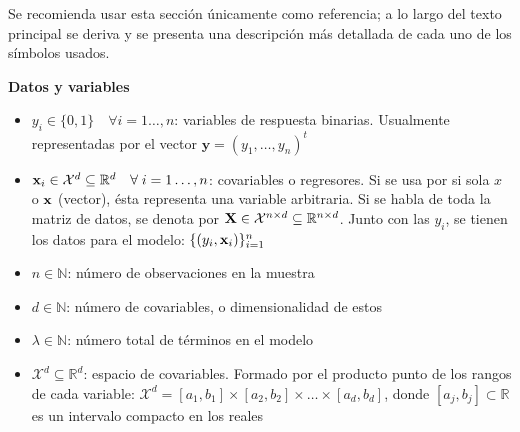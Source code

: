 \documentclass[../../Main/Main.tex]{subfiles}
\begin{document}
Se recomienda usar esta sección únicamente como referencia; a lo largo del texto principal se deriva y se presenta una descripción más detallada de cada uno de los símbolos usados. 

\textbf{Datos y variables}
\begin{itemize}[label={}]
	\item $y_i \in \{0,1\}\quad \forall i = 1\ldots,n$: variables de respuesta binarias. Usualmente representadas por el vector $\mathbf{y} = (y_1,\ldots,y_n)^t$
	\item $\mathbf{x}_i \in \mathcal{X}^d \subseteq \mathbb{R}^d\quad \forall \; i = 1\ldots,n$: covariables o regresores. Si se usa por si sola $x$ o $\mathbf{x}$ (vector), ésta representa una variable arbitraria. Si se habla de toda la matriz de datos, se denota por $\mathbf{X} \in \mathcal{X}^{n\times d}\subseteq \mathbb{R}^{n\times d}$. Junto con las $y_i$, se tienen los datos para el modelo: $\{(y_i,\mathbf{x}_i)\}_{i = 1}^n$
	\item $n \in \mathbb{N}$: número de observaciones en la muestra
	\item $d \in \mathbb{N}$: número de covariables, o dimensionalidad de estos
	\item $\lambda \in \mathbb{N}$: número total de términos en el modelo
	\item $\mathcal{X}^d \subseteq \mathbb{R}^d$: espacio de covariables. Formado por el producto punto de los rangos de cada variable: $\mathcal{X}^d = [a_1,b_1]\times[a_2,b_2]\times\ldots\times[a_d,b_d]$, donde $[a_j,b_j] \subset \mathbb{R}$ es un intervalo compacto en los reales
\end{itemize}
\end{document}
